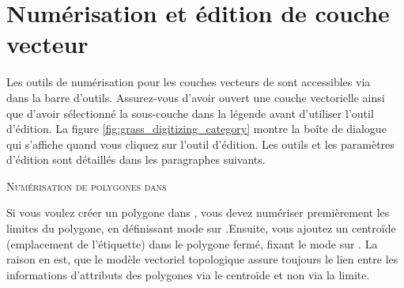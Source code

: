 {%
\section{Numérisation et édition de couche vecteur \grass}\label{grass_digitising}

Les outils de numérisation pour les couches vecteurs de \grass sont accessibles via\\  dans la barre d'outils. Assurez-vous d'avoir ouvert une couche vectorielle \grass ainsi que d'avoir sélectionné la sous-couche dans la légende avant d'utiliser l'outil d'édition. La figure \ref{fig:grass_digitizing_category} montre la boîte de dialogue \grass qui s'affiche quand vous cliquez sur l'outil d'édition. Les outils et les paramètres d'édition sont détaillés dans les paragraphes suivants.

\begin{Tip}\caption{\textsc{Numérisation de polygones dans \grass}}
Si vous voulez créer un polygone dans \grass, vous devez numériser premièrement les limites du polygone, en définissant mode sur .Ensuite, vous ajoutez un centroïde (emplacement de l'étiquette) dans le polygone fermé, fixant le mode sur . La raison en est, que le modèle vectoriel topologique assure toujours le lien entre les informations d'attributs des polygones via le centroïde et non via la limite.
\end{Tip}

}
